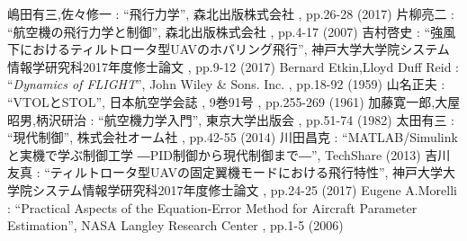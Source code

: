 
\begin{thebibliography}{99}


嶋田有三,佐々修一 : ``飛行力学'', 森北出版株式会社 , pp.26-28 (2017)
片柳亮二 : ``航空機の飛行力学と制御'', 森北出版株式会社 , pp.4-17 (2007)
吉村啓史 : ``強風下におけるティルトロータ型UAVのホバリング飛行'', 神戸大学大学院システム情報学研究科2017年度修士論文 , pp.9-12 (2017)
Bernard Etkin,Lloyd Duff Reid : ``\textit{Dynamics of FLIGHT}'', John Wiley & Sons. Inc. , pp.18-92 (1959)
山名正夫 : ``VTOLとSTOL'', 日本航空学会誌 , 9巻91号 , pp.255-269 (1961)
加藤寛一郎,大屋昭男,柄沢研治 : ``航空機力学入門'', 東京大学出版会 , pp.51-74  (1982)
太田有三 : ``現代制御'', 株式会社オーム社 , pp.42-55 (2014)
川田昌克 : ``MATLAB/Simulinkと実機で学ぶ制御工学 ―PID制御から現代制御まで―'', TechShare (2013)
吉川友真 : ``ティルトロータ型UAVの固定翼機モードにおける飛行特性'', 神戸大学大学院システム情報学研究科2017年度修士論文 , pp.24-25 (2017)
Eugene A.Morelli : ``Practical Aspects of the Equation-Error Method for Aircraft Parameter Estimation'', NASA Langley Research Center , pp.1-5 (2006)


\end{thebibliography}

\newpage
